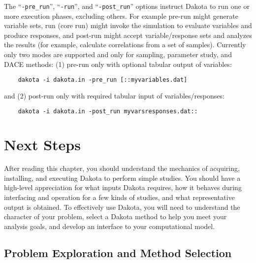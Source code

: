 The ``\texttt{-pre\_run}'', ``\texttt{-run}'', and
``\texttt{-post\_run}'' options instruct Dakota to run one or more
execution phases, excluding others. For example pre-run might
generate variable sets, run (core run) might invoke the simulation to
evaluate variables and produce responses, and post-run might accept
variable/response sets and analyzes the results (for example,
calculate correlations from a set of samples). Currently only two
modes are supported and only for sampling, parameter study, and DACE
methods: (1) pre-run only with optional tabular output of variables:
\begin{small}
\begin{verbatim}
    dakota -i dakota.in -pre_run [::myvariables.dat]
\end{verbatim}
\end{small}
and (2) post-run only with required tabular input of variables/responses:
\begin{small}
\begin{verbatim}
    dakota -i dakota.in -post_run myvarsresponses.dat::
\end{verbatim}
\end{small}


\section{Next Steps}\label{tutorial:nextsteps}

After reading this chapter, you should understand the mechanics of
acquiring, installing, and executing Dakota to perform simple studies.
You should have a high-level appreciation for what inputs Dakota
requires, how it behaves during interfacing and operation for a few
kinds of studies, and what representative output is obtained.  To
effectively use Dakota, you will need to understand the character of
your problem, select a Dakota method to help you meet your analysis
goals, and develop an interface to your computational model.

\subsection{Problem Exploration and Method Selection}\label{tutorial:exploration}

